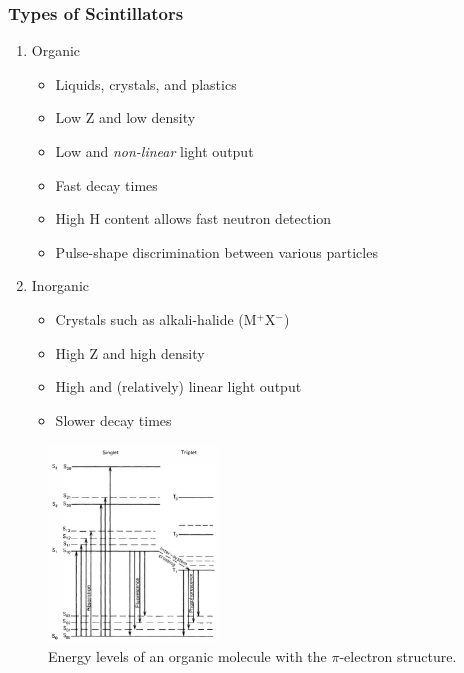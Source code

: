 \subsubsection{Types of Scintillators}
\begin{enumerate}
    \item Organic
    \begin{itemize}
        \item Liquids, crystals, and plastics
        \item Low Z and low density
        \item Low and \emph{non-linear} light output
        \item Fast decay times
        \item High H content allows fast neutron detection
        \item Pulse-shape discrimination between various particles
    \end{itemize}
    \item Inorganic
    \begin{itemize}
        \item Crystals such as alkali-halide (M$^+$X$^-$)
        \item High Z and high density
        \item High and (relatively) linear light output
        \item Slower decay times
    \end{itemize}
\end{enumerate}
\begin{figure}[ht]
    \centering
    \includegraphics[width=0.4\textwidth]{images/organic_scintillator_energy_level.png}
    \caption{Energy levels of an organic molecule with the $\pi$-electron structure.}
    \label{fig:organic_scintillator_energy_level}
\end{figure}
